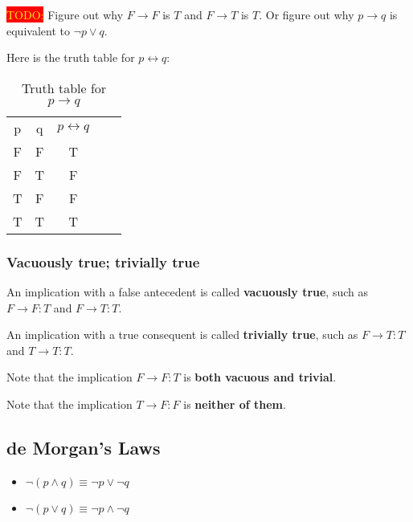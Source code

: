 \documentclass[12pt, letterpaper, oneside]{book}
\begin{document}
\colorbox{red}{\textcolor{yellow}{TODO:}} Figure out why $F \rightarrow F$ is
$T$ and $F \rightarrow T$ is $T$. Or figure out why $p \rightarrow q$ is
equivalent to $\lnot p \lor q$.

Here is the truth table for $p \leftrightarrow q$:

\begin{table}[H]
  \centering
  \begin{tabular}{|c|c|c|ll}
    \cline{1-3}
    p & q & $p \leftrightarrow q$ &  & \\ [1ex] \cline{1-3}
    F & F & T                     &  & \\ [0.5ex] \cline{1-3}
    F & T & F                     &  & \\ [0.5ex] \cline{1-3}
    T & F & F                     &  & \\ [0.5ex] \cline{1-3}
    T & T & T                     &  & \\ [0.5ex] \cline{1-3}
  \end{tabular}
  \caption{Truth table for $p \rightarrow q$}
\end{table}

\subsubsection{Vacuously true; trivially true}

An implication with a false antecedent is called \textbf{vacuously true}, such
as $F \rightarrow F: T$ and $F \rightarrow T: T$.

An implication with a true consequent is called \textbf{trivially true}, such
as $F \rightarrow T: T$ and $T \rightarrow T: T$.

Note that the implication $F \rightarrow F: T$ is \textbf{both vacuous and
  trivial}.

Note that the implication $T \rightarrow F: F$ is \textbf{neither of them}.

\subsection{de Morgan's Laws}

\begin{itemize}
  \item $\lnot (p \land q) \equiv \lnot p \lor \lnot q$
  \item $\lnot (p \lor q) \equiv \lnot p \land \lnot q$
\end{itemize}
\end{document}
